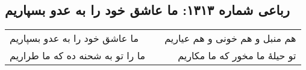 \begin{center}
\section*{رباعی شماره ۱۳۱۳: ما عاشق خود را به عدو بسپاریم}
\label{sec:1313}
\begin{longtable}{l p{0.5cm} r}
ما عاشق خود را به عدو بسپاریم
&&
هم منبل و هم خونی و هم عیاریم
\\
ما را تو به شحنه ده که ما طراریم
&&
تو حیلهٔ ما مخور که ما مکاریم
\\
\end{longtable}
\end{center}
